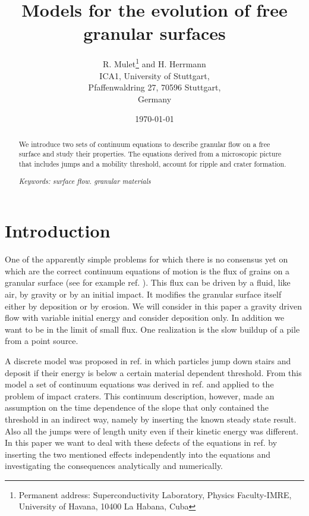 
\title{Models for the evolution of free granular surfaces}

\author{R. Mulet\thanks{Permanent address:
 Superconductivity Laboratory, Physics Faculty-IMRE,
University of Havana,
10400 La Habana, Cuba} \hspace{0.1cm} 
and H. Herrmann\\
ICA1, University of Stuttgart,\\
Pfaffenwaldring 27, 70596 Stuttgart,\\
Germany}

\date{\today}


\maketitle

\begin{abstract}
We introduce two sets of continuum equations to describe
granular flow on a free surface and study their
properties. The equations derived from a microscopic picture 
that includes  jumps and a mobility threshold, account for 
ripple and crater formation.


{\em Keywords: surface flow. granular materials}
\end{abstract}

\section{Introduction}
One of the apparently simple problems for which there is no consensus yet
on which are the correct continuum equations of motion is the flux
of grains on a granular surface (see for example ref. \cite{BCRE,Cargese,Boutreaux}). This flux can be driven by a fluid,
like air, by gravity or by an initial impact. It modifies the granular
surface itself either by deposition or by erosion. We will consider in this
paper a gravity driven flow with variable initial energy and consider 
deposition only. In addition we want to be in the limit of small flux.
One realization is the slow buildup of a pile from a point source.

A discrete model was proposed in ref.
\cite{Alonso_97} in which particles jump
down stairs and deposit if their energy is below a certain material
dependent threshold. From this model a set of continuum equations
was derived in ref.\cite{Grasselli_98} and applied to the problem of
impact craters. This continuum description, however, made an assumption
on the time dependence of the slope that only contained the threshold
in an indirect way, namely by inserting the known steady state
result. Also all the jumps were of length unity even if their
kinetic energy was different. In this paper we want to deal with these
defects of the equations in ref. \cite{Grasselli_98}
 by inserting the two mentioned
effects independently into the equations and investigating the
consequences analytically and numerically.


